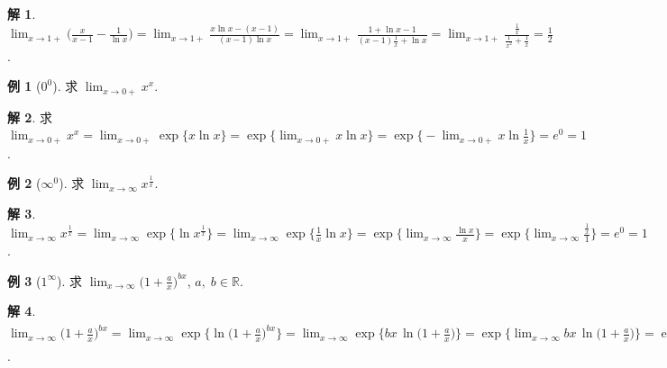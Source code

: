 \documentclass[12pt]{extarticle}
\newcommand{\ds}{\displaystyle}
\theoremstyle{definition}
\newtheorem*{ex}{例}
\newtheorem*{sol}{解}
\begin{document}
\begin{sol}
  $\ds\lim_{x\to 1+}\Big(\frac{x}{x - 1} - \frac{1}{\ln x}\Big) = \lim_{x\to 1+}\frac{x\ln x - (x - 1)}{(x - 1)\ln x} = \lim_{x\to 1+}\frac{1 + \ln x - 1}{(x - 1)\frac{1}{x} + \ln x} = \lim_{x\to 1+}\frac{\frac{1}{x}}{\frac{1}{x^2} + \frac{1}{x}} = \frac{1}{2}$. 
\end{sol}

\begin{ex}[$0^0$]
  求 $\ds\lim_{x\to 0+} x^x$. 
\end{ex}

\begin{sol}
  求 $\ds\lim_{x\to 0+} x^x = \lim_{x\to 0+} \exp\{x\ln x\} = \exp\big\{\lim_{x\to 0+} x\ln x\big\} = \exp\Big\{-\lim_{x\to 0+} x\ln\frac{1}{x}\Big\} = e^0 = 1$. 
\end{sol}

%

\begin{ex}[$\infty^0$]
  求 $\ds\lim_{x\to\infty} x^{\frac{1}{x}}$.  
\end{ex}

\begin{sol}
  $\ds\lim_{x\to\infty} x^{\frac{1}{x}} = \lim_{x\to\infty}\exp\big\{\ln x^{\frac{1}{x}}\big\} = \lim_{x\to\infty}\exp\Big\{\frac{1}{x}\ln x\Big\} = \exp\Big\{\lim_{x\to\infty}\frac{\ln x}{x}\Big\} = \exp\Big\{\lim_{x\to\infty}\frac{\frac{1}{x}}{1}\Big\} = e^0 = 1$.  
\end{sol}

\begin{ex}[$1^\infty$]
  求 $\ds\lim_{x\to\infty} \Big(1 + \frac{a}{x}\Big)^{bx}$, $a,\;b\in\mathbb{R}$. 
\end{ex}

\begin{sol}
  $\ds\lim_{x\to\infty} \Big(1 + \frac{a}{x}\Big)^{bx} = \lim_{x\to\infty} \exp\Big\{\ln\big(1 + \frac{a}{x}\big)^{bx}\Big\} = \lim_{x\to\infty} \exp\Big\{bx\,\ln\big(1 + \frac{a}{x}\big)\Big\} = \exp\Big\{\lim_{x\to\infty} bx\,\ln\big(1 + \frac{a}{x}\big)\Big\} = \exp\bigg\{b\lim_{x\to\infty}\frac{\ln(1 + \frac{a}{x})}{\frac{1}{x}}\bigg\} = \exp\bigg\{b\lim_{x\to\infty}\frac{\frac{1}{1 + \frac{a}{x}}\cdot\frac{-a}{x^2}}{\frac{-1}{x^2}}\bigg\} = \exp\bigg\{b\lim_{x\to\infty}\frac{a}{1 + \frac{a}{x}}\bigg\} = e^{ba}$. 
\end{sol}
\end{document}
